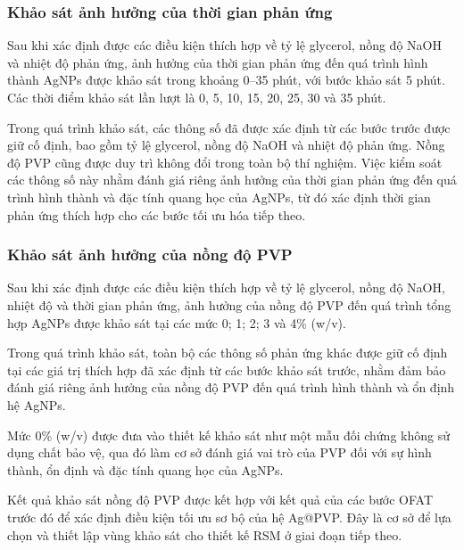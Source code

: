 \subsubsection{Khảo sát ảnh hưởng của thời gian phản ứng}
Sau khi xác định được các điều kiện thích hợp về tỷ lệ glycerol, nồng độ NaOH và nhiệt độ phản ứng, ảnh hưởng của thời gian phản ứng đến quá trình hình thành AgNPs được khảo sát trong khoảng 0–35 phút, với bước khảo sát 5 phút. 
Các thời điểm khảo sát lần lượt là 0, 5, 10, 15, 20, 25, 30 và 35 phút.

Trong quá trình khảo sát, các thông số đã được xác định từ các bước trước được giữ cố định, bao gồm tỷ lệ glycerol, nồng độ NaOH và nhiệt độ phản ứng. 
Nồng độ PVP cũng được duy trì không đổi trong toàn bộ thí nghiệm. 
Việc kiểm soát các thông số này nhằm đánh giá riêng ảnh hưởng của thời gian phản ứng đến quá trình hình thành và đặc tính quang học của AgNPs, từ đó xác định thời gian phản ứng thích hợp cho các bước tối ưu hóa tiếp theo.

\subsubsection{Khảo sát ảnh hưởng của nồng độ PVP}
Sau khi xác định được các điều kiện thích hợp về tỷ lệ glycerol, nồng độ NaOH, nhiệt độ và thời gian phản ứng, ảnh hưởng của nồng độ PVP đến quá trình tổng hợp AgNPs được khảo sát tại các mức 0; 1; 2; 3 và 4\% (w/v).

Trong quá trình khảo sát, toàn bộ các thông số phản ứng khác được giữ cố định tại các giá trị thích hợp đã xác định từ các bước khảo sát trước, nhằm đảm bảo đánh giá riêng ảnh hưởng của nồng độ PVP đến quá trình hình thành và ổn định hệ AgNPs.

Mức 0\% (w/v) được đưa vào thiết kế khảo sát như một mẫu đối chứng không sử dụng chất bảo vệ, qua đó làm cơ sở đánh giá vai trò của PVP đối với sự hình thành, ổn định và đặc tính quang học của AgNPs.

Kết quả khảo sát nồng độ PVP được kết hợp với kết quả của các bước OFAT trước đó để xác định điều kiện tối ưu sơ bộ của hệ Ag@PVP. 
Đây là cơ sở để lựa chọn và thiết lập vùng khảo sát cho thiết kế RSM ở giai đoạn tiếp theo.

